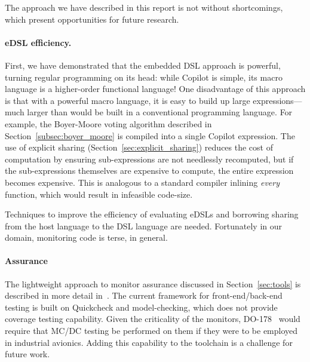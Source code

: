 The approach we have described in this report is not without shortcomings, which
present opportunities for future research.

\paragraph{eDSL efficiency.}
First, we have demonstrated that the embedded DSL approach is powerful,
turning regular programming on its head: while Copilot is simple, its
macro language is a higher-order functional language!  One disadvantage of this
approach is that with a powerful macro language, it is easy to
build up large expressions---much larger than would be built in a
conventional programming language.  For example, the Boyer-Moore
voting algorithm described in Section~\ref{subsec:boyer_moore} is compiled into
a single Copilot expression.  The use of explicit sharing
(Section~\ref{sec:explicit_sharing}) reduces the cost of computation by ensuring
sub-expressions are not needlessly recomputed, but if the sub-expressions
themselves are expensive to compute, the entire expression becomes expensive.
This is analogous to a standard compiler inlining \emph{every} function, which
would result in infeasible code-size.  

Techniques to improve the efficiency of evaluating eDSLs and borrowing sharing
from the host language to the DSL language are needed.  Fortunately in our
domain, monitoring code is terse, in general.

\paragraph{Assurance}
The lightweight approach to monitor assurance discussed in
Section~\ref{sec:tools} is described in more detail
in~\cite{PikeWNG2012}.  The current framework for front-end/back-end
testing is built on Quickcheck and model-checking, which does not provide coverage
testing capability.  Given the criticality of the monitors,
DO-178~\cite{DO178B} would require that MC/DC testing be performed on
them if they were to be employed in industrial avionics. Adding this
capability to the toolchain is a challenge for future work.


